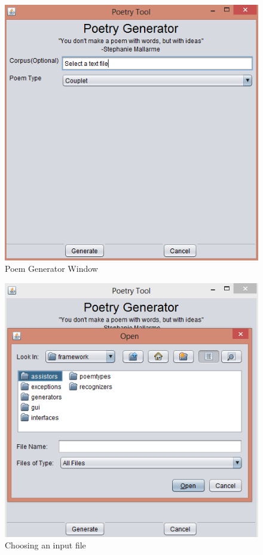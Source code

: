 \documentclass[10pt, letter]{article}
\begin{document}
\begin{figure}[ht]
  \centering
    \includegraphics[scale=0.5]{Images/screen3}
    \caption{Poem Generator Window}
  \label{screen3}
\end{figure}

\begin{figure}[ht]
  \centering
    \includegraphics[scale=0.5]{Images/screen5}
    \caption{Choosing an input file}
  \label{screen4}
\end{figure}
\end{document}
